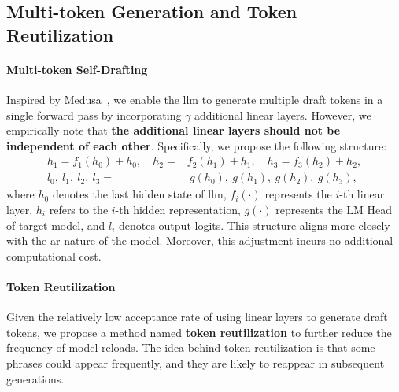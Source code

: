 \subsection{Multi-token Generation and Token Reutilization}
\label{sec:multi_token}
\paragraph{Multi-token Self-Drafting} 
Inspired by Medusa~\citep{medusa}, we enable the \ac{llm} to generate multiple draft tokens in a single forward pass by incorporating $\gamma$ additional linear layers. However, we empirically note that \textbf{the additional linear layers should not be independent of each other}. Specifically, we propose the following structure:
\begin{equation}
\label{equ:ours}
    \begin{aligned}
    h_1=f_1(h_0) + h_0,\quad{}h_2=&f_2(h_1) + h_1,\quad{}h_3=f_3(h_2) + h_2,\\
l_0,~l_{1},~l_{2},~l_{3}=&~g(h_0),~g(h_1),~g(h_2),~g(h_3),
    \end{aligned}
\end{equation}
where $h_0$ denotes the last hidden state of \ac{llm}, $f_i(\cdot)$ represents the $i$-th linear layer, $h_i$ refers to the $i$-th hidden representation, $g(\cdot)$ represents the LM Head of target model, and $l_i$ denotes output logits.
This structure aligns more closely with the \ac{ar} nature of the model. Moreover, this adjustment incurs no additional computational cost.
\vspace{-0.05 in}
\paragraph{Token Reutilization} 
Given the relatively low acceptance rate of using linear layers to generate draft tokens, we propose a method named \textbf{token reutilization} to further reduce the frequency of model reloads. The idea behind token reutilization is that some phrases could appear frequently, and they are likely to reappear in subsequent generations.

